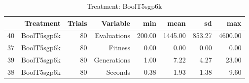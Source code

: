 \begin{table}[ht]
\centering
\begin{tabular}{rrrrrrrr}
  \hline
 & Treatment & Trials & Variable & min & mean & sd & max \\ 
  \hline
40 & BoolT5sgp6k &  80 & Evaluations & 200.00 & 1445.00 & 853.27 & 4600.00 \\ 
  37 & BoolT5sgp6k &  80 & Fitness & 0.00 & 0.00 & 0.00 & 0.00 \\ 
  39 & BoolT5sgp6k &  80 & Generations & 1.00 & 7.22 & 4.27 & 23.00 \\ 
  38 & BoolT5sgp6k &  80 & Seconds & 0.38 & 1.93 & 1.38 & 9.60 \\ 
   \hline
\end{tabular}
\caption{Treatment: BoolT5sgp6k} 
\end{table}
